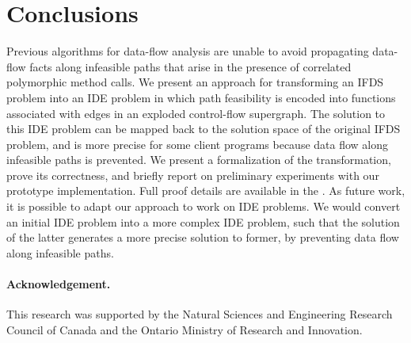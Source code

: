 \section{Conclusions}
  \label{sec:Conclusions}
  
Previous algorithms for data-flow analysis are unable to avoid propagating
data-flow facts along infeasible paths that arise in the presence of
correlated polymorphic method calls. 
% 
We present an approach for transforming an IFDS problem into an IDE problem
in which path feasibility is encoded into functions associated
with edges in an exploded control-flow supergraph. The solution to this
IDE problem can be mapped back to the solution space of the original IFDS
problem, and is more precise for some client programs because data flow along
infeasible paths is prevented. We present a formalization of the
transformation, prove its correctness, and briefly report on
preliminary experiments with our prototype implementation. Full proof
details are available in the \reportOrAppendix.
%  
As future work, it is possible to adapt our approach to work on IDE
problems. We would convert an initial IDE problem into a more complex IDE problem, 
such that the solution of the latter generates a more precise
solution to former, by preventing data flow along infeasible paths.

\paragraph{Acknowledgement.}
This research was supported by the Natural Sciences and Engineering
Research Council of Canada and the Ontario Ministry of Research and
Innovation.
